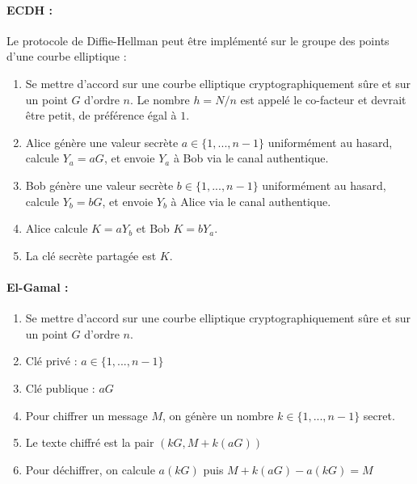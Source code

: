 \documentclass[11pt,a4paper]{report}
\begin{document}
\paragraph*{ECDH :} Le protocole de Diffie-Hellman peut être implémenté sur le
groupe des points d’une courbe elliptique :
\begin{enumerate}
    \item Se mettre d’accord sur une courbe elliptique cryptographiquement sûre et sur un point $G$ d’ordre $n$. Le nombre $h = N/n$ est appelé le co-facteur et devrait être petit, de préférence égal à $1$.
    \item Alice génère une valeur secrète $a \in \{1,...,n-1\}$ uniformément au hasard, calcule $Y_a = aG$, et envoie $Y_a$ à Bob via le canal authentique.
    \item Bob génère une valeur secrète $b \in \{1,...,n-1\}$ uniformément au hasard, calcule $Y_b=bG$, et envoie $Y_b$ à Alice via le canal authentique.
    \item Alice calcule $K=aY_b$ et Bob $K=bY_a$.
    \item La clé secrète partagée est $K$.
\end{enumerate}

\paragraph*{El-Gamal :}
\begin{enumerate}
    \item Se mettre d'accord sur une courbe elliptique cryptographiquement sûre et sur un point $G$ d'ordre $n$.
    \item Clé privé : $a\in\{1,...,n-1\}$
    \item Clé publique : $aG$
    \item Pour chiffrer un message $M$, on génère un nombre $k\in\{1,...,n-1\}$ secret.
    \item Le texte chiffré est la pair $(kG,M+k(aG))$
    \item Pour déchiffrer, on calcule $a(kG)$ puis $M+k(aG)-a(kG)=M$
\end{enumerate}
\end{document}
